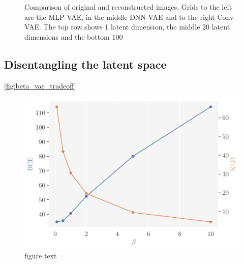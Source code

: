\begin{figure}[!htb]
\qquad
{}
\caption{Comparison of original and reconstructed images. Grids to the left are the MLP-VAE, in the middle DNN-VAE and to the right Conv-VAE. The top row shows 1 latent dimension, the middle 20 latent dimensions and the bottom 100}
\label{fig:samples_latent_dim_vanilla_vae_bmnist}
\end{figure}






\subsection{Disentangling the latent space}

\autoref{fig:beta_vae_tradeoff}
\begin{figure}[!htb]
\begin{center}\includegraphics[scale=0.75]{latex/figures/bce_kld_vs_beta.pdf}
\end{center}
\caption{figure text}
\label{fig:beta_vae_tradeoff}
\end{figure}


